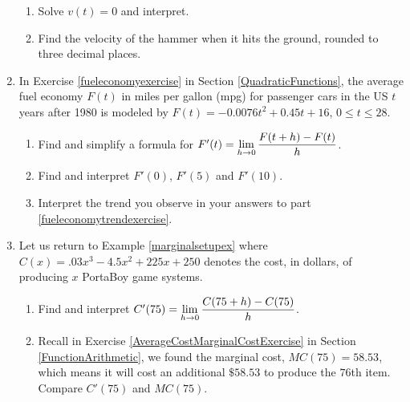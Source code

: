 \begin{enumerate}
\begin{enumerate}
\item  Solve $v(t) = 0$ and interpret.

\item  Find the velocity of the hammer when it hits the ground, rounded to three decimal places.

\end{enumerate}

\item  In Exercise \ref{fueleconomyexercise}  in Section \ref{QuadraticFunctions}, the average fuel economy $F(t)$ in miles per gallon (mpg) for passenger cars in the US $t$ years after 1980 is modeled by  $F(t) = -0.0076t^2+0.45t + 16$, $0 \leq t \leq 28$. 

\begin{enumerate}

\item  Find and simplify a formula for  $F'(t) = \displaystyle{\lim_{h \rightarrow 0} \dfrac{F(t + h) - F(t)}{h}}$.

\item\label{fueleconomytrendexercise}  Find and interpret $F'(0)$, $F'(5)$ and $F'(10)$.

\item  Interpret the trend you observe in your answers to part \ref{fueleconomytrendexercise}.

\end{enumerate}

\item\label{MarginalCostDerivativeExercise} Let us return to Example \ref{marginalsetupex} where  $C(x) = .03x^{3} - 4.5x^{2} + 225x + 250$ denotes the cost, in dollars,  of producing $x$ PortaBoy game systems.

\begin{enumerate}

\item  Find and interpret $C'(75) = \displaystyle{\lim_{h \rightarrow 0} \dfrac{C(75+h) - C(75)}{h}}$.

\item  Recall in Exercise \ref{AverageCostMarginalCostExercise} in Section \ref{FunctionArithmetic}, we found the marginal cost, $MC(75) = 58.53$,   which means it will cost an additional $\$ 58.53$ to produce the $76$th item.  Compare $C'(75)$ and $MC(75)$. 

\end{enumerate}

\setcounter{HW}{\value{enumi}}
\end{enumerate}

\newpage


